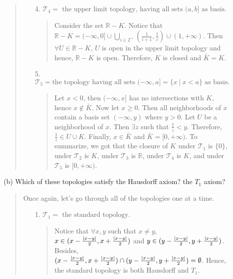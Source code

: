 \documentclass[12pt, a4paper]{article}
\newcommand{\pints}{\mathbb{Z}^+} %
\newcommand{\reals}{\mathbb{R}} %
\newcommand{\topology}{\mathcal{T}} %
\DeclarePairedDelimiter\abs{\lvert}{\rvert}
\begin{document}
\begin{itemize}
\begin{itemize}
\begin{quote}
\begin{itemize}
\item[]

\item[4.]
$\topology_4 = \mbox{ the upper limit topology, having all sets $(a, b]$ as basis.}$
\begin{quote}
Consider the set $\reals - K$. Notice that $\reals - K = (-\infty, 0] \cup \bigcup_{i \in \pints}(\frac{1}{i + 1}, \frac{1}{i}) \cup (1, +\infty)$.
Then $\forall U \in \reals - K$, $U$ is open in the upper limit topology and hence, $\reals - K$ is open.
Therefore, $K$ is closed and $\bar{K} = K$.
\end{quote}

\item[]

\item[5.]
$\topology_5 = \mbox{the topology having all sets }(-\infty, a] = \{x \ | \ x < a\} \mbox{ as basis.}$
\begin{quote}
Let $x < 0$, then $(-\infty, x]$ has no intersections with $K$, hence $x \notin \bar{K}$. Now let $x \geq 0$. Then
all neighborhoods of $x$ contain a basis set $(-\infty, y)$
where $y > 0$. Let $U$ be a neighborhood of $x$. Then $\exists z$ such that $\frac{1}{z} < y$. Therefore, $\frac{1}{z} \in U \cup K$. Finally, $x \in \bar{K}$ and $\bar{K} = [0, +\infty)$.
\newline
\newline
To summarize, we got that the closure of $K$ under $\topology_1$ is $\{0\}$, under $\topology_2$ is $K$, under
$\topology_3$ is $\reals$, under $\topology_4$ is $K$,
and under $\topology_5$ is $[0, +\infty)$.
\end{quote}
\end{itemize}
\end{quote}

\item[]
\item[]

\item[(b)]
Which of these topologies satisfy the Hausdorff axiom? the $T_1$ axiom?
\begin{quote}
Once again, let's go through all of the topologies one at a time.
\begin{itemize}
\item[1.]
$\topology_1 = \mbox{ the standard topology.}$
\begin{quote}
Notice that $\forall x, y$ such that $x \neq y$, $x \in (x - \frac{{\abs{x - y}}}{2}, x + \frac{{\abs{x - y}}}{2})$
and $y \in (y - \frac{{\abs{x - y}}}{2}, y + \frac{{\abs{x - y}}}{2})$. Besides, $(x - \frac{{\abs{x - y}}}{2}, x + \frac{{\abs{x - y}}}{2}) \cap (y - \frac{{\abs{x - y}}}{2}, y + \frac{{\abs{x - y}}}{2}) = \emptyset$. Hence, the standard
topology is both Hausdorff and $T_1$.
\end{quote}


\end{itemize}
\end{quote}
\end{itemize}
\end{itemize}
\end{document}
